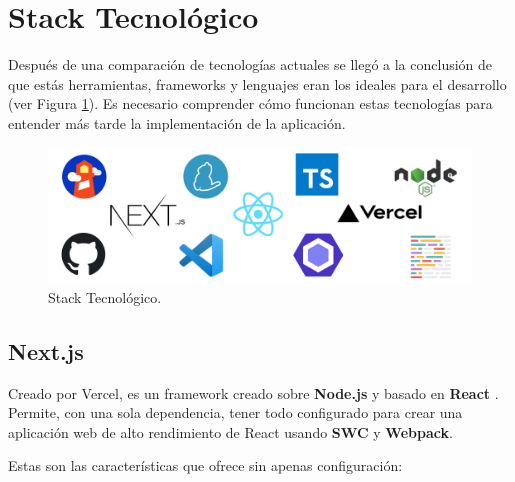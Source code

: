 \documentclass[12pt,twoside,titlepage]{report}
\begin{document}
\section{Stack Tecnológico}
\label{sec:stack}

Después de una comparación de tecnologías actuales se llegó a la conclusión de que estás herramientas, frameworks y lenguajes eran los ideales para el desarrollo (ver Figura \ref{fig:logos}). Es necesario comprender cómo funcionan estas tecnologías para entender más tarde la implementación de la aplicación.

\begin{figure}[H]
    \centering
    \includegraphics[width=\textwidth]{Logos/Logos}
    \caption{Stack Tecnológico.}
    \label{fig:logos}
\end{figure}

\subsection{Next.js}
\label{sec:Next}

Creado por Vercel, es un framework creado sobre \textbf{Node.js} y basado en \textbf{React} \cite{nextjs1}.
Permite, con una sola dependencia, tener todo configurado para crear una aplicación web de alto rendimiento de React usando \textbf{SWC} y \textbf{Webpack}. 

Estas son las características \cite{nextjs2} que ofrece sin apenas configuración:
\end{document}
